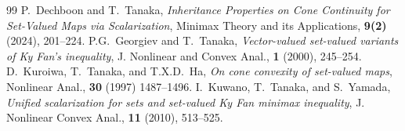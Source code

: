 \documentclass[a4paper,10pt]{jsarticle}
\begin{document}
\begin{thebibliography}{99}
  \bibitem{} {\rm P.~Dechboon and T.~Tanaka},
  {\em Inheritance Properties on Cone Continuity for Set-Valued Maps via Scalarization},
  Minimax Theory and its Applications, {\bf 9(2)} (2024), 201--224.
  \bibitem{} {\rm P.G.~Georgiev and T.~Tanaka},
  {\em Vector-valued set-valued variants of Ky Fan's inequality},
  J. Nonlinear and Convex Anal., {\bf 1} (2000), 245--254.
  \bibitem{} {\rm D.~Kuroiwa, T.~Tanaka, and T.X.D.~Ha},
  {\em  On cone convexity of set-valued maps},
  Nonlinear Anal., {\bf 30} (1997) 1487--1496.
  \bibitem{} {\rm I.~Kuwano, T.~Tanaka, and S.~Yamada},
  {\em Unified scalarization for sets and set-valued Ky Fan minimax inequality},
  J. Nonlinear Convex Anal., {\bf 11} (2010), 513--525.
\end{thebibliography}
\end{document}
